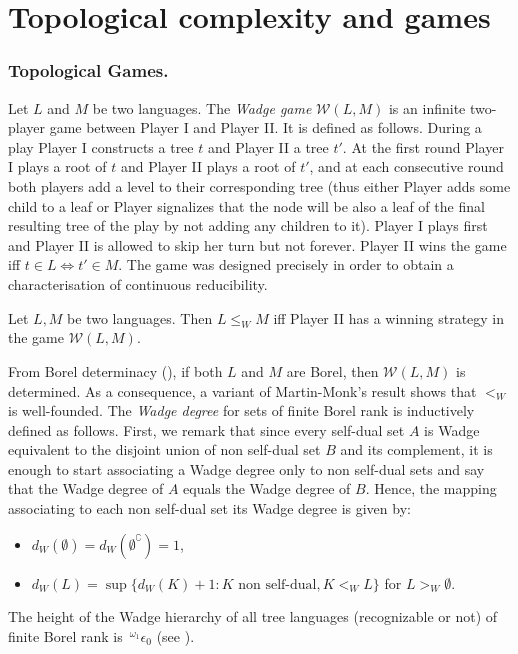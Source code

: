 \section{Topological complexity and games}\label{section:games}
\subsubsection*{Topological Games.}
Let $L$ and $M$ be two languages. The {\em Wadge game}
$\mathcal{W}(L, M)$ is an infinite two-player game between Player I and Player II. It is defined as follows. During a play Player I constructs a tree $t$ and Player II a tree $t'$. At the first round Player I plays a root of $t$ and Player II plays a root of $t'$, and at each consecutive round both players add a level
to their corresponding tree (thus either Player adds some child to a leaf or Player signalizes that the node will be also a leaf of the final resulting tree of the play by not adding any children to it).
Player I plays first and Player II is allowed to
skip her turn but not forever.  Player II wins the game iff $t \in L
\Leftrightarrow t' \in M$.  
The game was designed precisely in order to obtain a characterisation of continuous reducibility.
\begin{lemma}\label{lemma:wadge}
Let $L, M$ be two languages. Then  $L \leq_W M$ iff Player II has a winning strategy in the game $\mathcal{W}(L, M)$.
\end{lemma}
From Borel determinacy (\cite{martin}),
if both $L$ and $M$ are Borel, then $\mathcal{W}(L, M)$ is determined.
As a consequence, a variant of Martin-Monk's result shows that $<_W$ is
well-founded. The \emph{Wadge degree} for sets of finite Borel rank is
inductively defined as follows. First, we remark that since every self-dual set $A$ is Wadge equivalent to the disjoint union of non self-dual set $B$ and its complement, it is enough to start associating a Wadge degree only to non self-dual sets and say that the Wadge degree of $A$ equals the Wadge degree of $B$. Hence, the mapping associating to each non self-dual set its Wadge degree is given by:
\begin{itemize}
\item $d_W(\emptyset)=d_W(\emptyset^\complement)=1$,
\item $d_W(L)=\sup\{d_W(K)+1\colon K \text{ non self-dual}, K <_WL\}$ for $L>_W\emptyset$.
\end{itemize}
The
height of the Wadge hierarchy of all tree languages (recognizable or
not) of finite Borel rank is $\,{}^{\omega_1} \epsilon_0$ (see \cite{dup1}).

